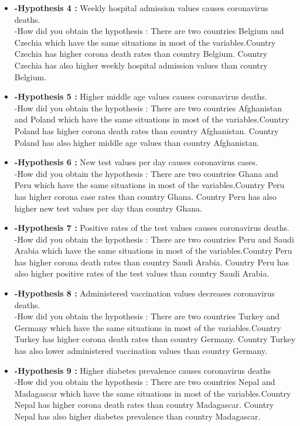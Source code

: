 \documentclass[a4 paper]{article}
\numberwithin{equation}{section}
\newcommand{\0}{\mathbf{0}}
\begin{document}
\begin{itemize}
    \item\textbf{-Hypothesis 4 :} Weekly hospital admission values causes coronavirus deaths.\\
        -How did you obtain the hypothesis : There are two countries Belgium and Czechia which have the same situations in most of the variables.Country Czechia has higher corona death rates than country Belgium. Country Czechia has also higher weekly hospital admission values than country Belgium.
    \item\textbf{-Hypothesis 5 :} Higher middle age values causes coronavirus deaths.\\
        -How did you obtain the hypothesis : There are two countries Afghanistan and Poland which have the same situations in most of the variables.Country Poland has higher corona death rates than country Afghanistan. Country Poland has also higher middle age values than country Afghanistan.
    \item\textbf{-Hypothesis 6 :} New test values per day causes coronavirus cases.\\
        -How did you obtain the hypothesis : There are two countries Ghana and Peru which have the same situations in most of the variables.Country Peru has higher corona case rates than country Ghana. Country Peru has also higher new test values per day than country Ghana.
    \item\textbf{-Hypothesis 7 :} Positive rates of the test values causes coronavirus deaths.\\
        -How did you obtain the hypothesis : There are two countries Peru and Saudi Arabia which have the same situations in most of the variables.Country Peru has higher corona death rates than country Saudi Arabia. Country Peru has also higher positive rates of the test values than country Saudi Arabia.
	\item\textbf{-Hypothesis 8 :} Administered vaccination values decreases coronavirus deaths.\\
        -How did you obtain the hypothesis : There are two countries Turkey and Germany which have the same situations in most of the variables.Country Turkey has higher corona death rates than country Germany. Country Turkey has also lower administered vaccination values than country Germany.
    \item\textbf{-Hypothesis 9 :} Higher  diabetes prevalence causes coronavirus deaths\\
        -How did you obtain the hypothesis : There are two countries Nepal and Madagascar which have the same situations in most of the variables.Country Nepal has higher corona death rates than country Madagascar. Country Nepal has also higher diabetes prevalence than country Madagascar.

\end{itemize}
\end{document}
